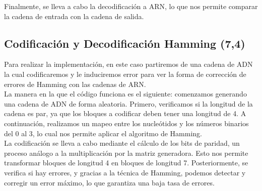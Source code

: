 Finalmente, se lleva a cabo la decodificación a ARN, lo que nos permite comparar la cadena de entrada con la cadena de salida.\\



\subsection{Codificación y Decodificación Hamming (7,4)}

Para realizar la implementación, en este caso partiremos de una cadena de ADN la cual codificaremos y le induciremos error para ver la forma de  corrección de errores de Hamming con las cadenas de ARN.\\

La manera en la que el código funciona es el siguiente: comenzamos generando una cadena de ADN de forma aleatoria. Primero, verificamos si la longitud de la cadena es par, ya que los bloques a codificar deben tener una longitud de 4. A continuación, realizamos un mapeo entre los nucleótidos y los números binarios del 0 al 3, lo cual nos permite aplicar el algoritmo de Hamming.\\

La codificación se lleva a cabo mediante el cálculo de los bits de paridad, un proceso análogo a la multiplicación por la matriz generadora. Esto nos permite transformar bloques de longitud 4 en bloques de longitud 7. Posteriormente, se verifica si hay errores, y gracias a la técnica de Hamming, podemos detectar y corregir un error máximo, lo que garantiza una baja tasa de errores.\\

